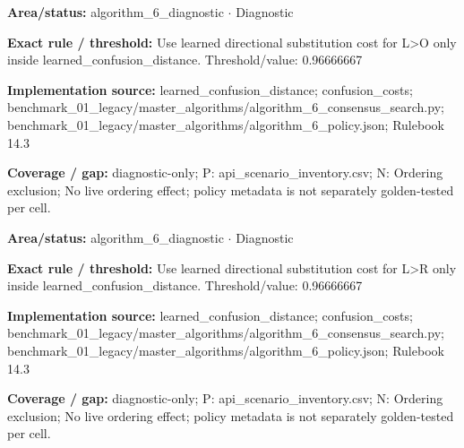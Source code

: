 \begin{tcolorbox}[enhanced,breakable,colback=white,colframe=Muted!45,boxrule=0.45pt,arc=1.5pt,left=6pt,right=6pt,top=5pt,bottom=5pt,title={\texttt{A6-LEARNED-SUBSTITUTION-L-O}},title after break={\texttt{A6-LEARNED-SUBSTITUTION-L-O}\ (continued)},fonttitle=\headingfont\bfseries\color{Navy},coltitle=Navy]
\textbf{Area/status:} algorithm\_\allowbreak{}6\_\allowbreak{}diagnostic $\boldsymbol{\cdot}$ Diagnostic\par
\smallskip
\textbf{Exact rule / threshold:} Use learned directional substitution cost for L>O only inside learned\_\allowbreak{}confusion\_\allowbreak{}distance. Threshold/\allowbreak{}value: 0.96666667\par
\smallskip
\textbf{Implementation source:} learned\_\allowbreak{}confusion\_\allowbreak{}distance; confusion\_\allowbreak{}costs; benchmark\_\allowbreak{}01\_\allowbreak{}legacy/\allowbreak{}master\_\allowbreak{}algorithms/\allowbreak{}algorithm\_\allowbreak{}6\_\allowbreak{}consensus\_\allowbreak{}search.py; benchmark\_\allowbreak{}01\_\allowbreak{}legacy/\allowbreak{}master\_\allowbreak{}algorithms/\allowbreak{}algorithm\_\allowbreak{}6\_\allowbreak{}policy.json; Rulebook 14.3\par
\smallskip
\textbf{Coverage / gap:} diagnostic-only; P: api\_\allowbreak{}scenario\_\allowbreak{}inventory.csv; N: Ordering exclusion; No live ordering effect; policy metadata is not separately golden-tested per cell.
\end{tcolorbox}
\begin{tcolorbox}[enhanced,breakable,colback=white,colframe=Muted!45,boxrule=0.45pt,arc=1.5pt,left=6pt,right=6pt,top=5pt,bottom=5pt,title={\texttt{A6-LEARNED-SUBSTITUTION-L-R}},title after break={\texttt{A6-LEARNED-SUBSTITUTION-L-R}\ (continued)},fonttitle=\headingfont\bfseries\color{Navy},coltitle=Navy]
\textbf{Area/status:} algorithm\_\allowbreak{}6\_\allowbreak{}diagnostic $\boldsymbol{\cdot}$ Diagnostic\par
\smallskip
\textbf{Exact rule / threshold:} Use learned directional substitution cost for L>R only inside learned\_\allowbreak{}confusion\_\allowbreak{}distance. Threshold/\allowbreak{}value: 0.96666667\par
\smallskip
\textbf{Implementation source:} learned\_\allowbreak{}confusion\_\allowbreak{}distance; confusion\_\allowbreak{}costs; benchmark\_\allowbreak{}01\_\allowbreak{}legacy/\allowbreak{}master\_\allowbreak{}algorithms/\allowbreak{}algorithm\_\allowbreak{}6\_\allowbreak{}consensus\_\allowbreak{}search.py; benchmark\_\allowbreak{}01\_\allowbreak{}legacy/\allowbreak{}master\_\allowbreak{}algorithms/\allowbreak{}algorithm\_\allowbreak{}6\_\allowbreak{}policy.json; Rulebook 14.3\par
\smallskip
\textbf{Coverage / gap:} diagnostic-only; P: api\_\allowbreak{}scenario\_\allowbreak{}inventory.csv; N: Ordering exclusion; No live ordering effect; policy metadata is not separately golden-tested per cell.
\end{tcolorbox}
